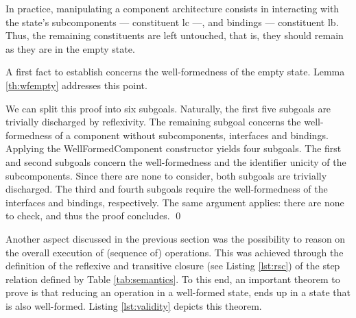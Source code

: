 	
	\noindent In practice, manipulating a \textsf{component} architecture consists in
	interacting with the \textsf{state}'s sub\textsf{component}s --- constituent \textsf{lc} ---, and bindings   
	--- constituent \textsf{lb}. Thus, the remaining constituents are left untouched, that is, they should remain
	as they are in the empty \textsf{state}.
	
		A first fact to establish concerns the well-formedness of the empty \textsf{state}. Lemma \ref{th:wfempty}
	addresses this	point.


	\begin{lemma} \label{th:wfempty}
				
			
		We can split this proof into six subgoals. Naturally, the first five subgoals are trivially discharged by reflexivity.		
	The remaining subgoal concerns the well-formedness of a \textsf{component} without sub\textsf{component}s,
	\textsf{interface}s and \textsf{binding}s. Applying the \textsf{WellFormedComponent} constructor yields
	four subgoals. The first and second subgoals concern the well-formedness and the \textsf{identifier} unicity 
	of the sub\textsf{component}s. Since there are none to consider, both subgoals are trivially discharged.
	The third and fourth subgoals require the well-formedness of the \textsf{interface}s and \textsf{binding}s, 
	respectively. The same argument applies: there are none to check, and thus the proof concludes. \qed
	\end{lemma}	

	 
	
	Another aspect discussed in the previous section was the possibility to reason on the
	overall execution of (sequence of) \textsf{operation}s. This was achieved through the definition
	of the reflexive and transitive closure (see Listing \ref{lst:rsc}) of the \textsf{step} relation 
	defined by Table \ref{tab:semantics}. To this end, an important theorem to prove is 
	that reducing an \textsf{operation} in a well-formed \textsf{state}, 
	ends up in a \textsf{state} that is also well-formed.
	Listing \ref{lst:validity} depicts this theorem.
	
				
	
